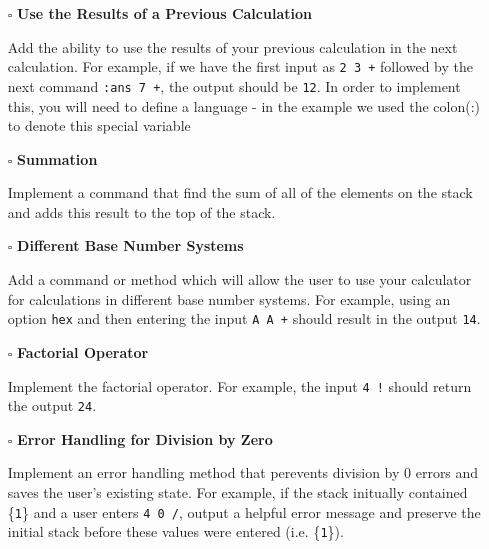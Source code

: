 \documentclass{article}
\begin{document}
\newpage

\begin{itemize}
  \item[$\square$] \textbf{Use the Results of a Previous Calculation}
  
	Add the ability to use the results of your previous calculation in the next calculation. For example, if we have the first input as \texttt{2 3 +} followed by the next command \texttt{:ans 7 +}, the output should be \texttt{12}. In order to implement this, you will need to define a language - in the example we used the colon(:) to denote this special variable \newline
\end{itemize}

\begin{itemize}
  \item[$\square$] \textbf{Summation}
  
Implement a command that find the sum of all of the elements on the stack and adds this result to the top of the stack.\newline
\end{itemize}

\begin{itemize}
  \item[$\square$] \textbf{Different Base Number Systems}
  
Add a command or method which will allow the user to use your calculator for calculations in different base number systems. For example, using an option \texttt{hex} and then entering the input \texttt{A A +} should result in the output \texttt{14}.\newline 
\end{itemize}


\begin{itemize}
  \item[$\square$] \textbf{Factorial Operator}
  
Implement the factorial operator. For example, the input \texttt{4 !} should return the output \texttt{24}. \newline
\end{itemize}

\begin{itemize}
  \item[$\square$] \textbf{Error Handling for Division by Zero}
  
Implement an error handling method that perevents division by 0 errors and saves the user's existing state. For example, if the stack initually contained \{\texttt{1}\} and a user enters \texttt{4 0 /}, output a helpful error message and preserve the initial stack before these values were entered (i.e. \{\texttt{1}\}). \newline
\end{itemize}
\end{document}
